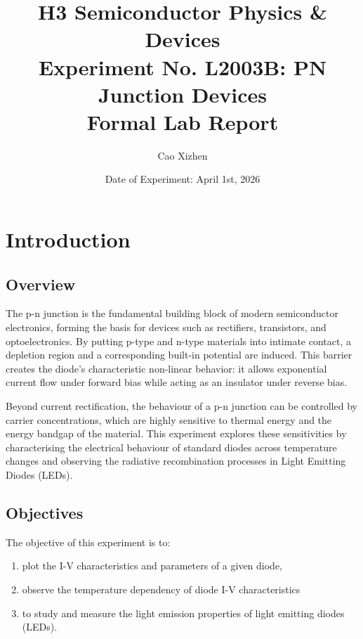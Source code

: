 \documentclass[1pt]{article}
\title{H3 Semiconductor Physics \& Devices\\Experiment No. L2003B: PN Junction Devices\\Formal Lab Report}
\author{Cao Xizhen}
\affil{Hwa Chong Institution (College Section)}
\date{Date of Experiment: April 1st, 2026}
\begin{document}
\maketitle
\tableofcontents
\clearpage

\section{Introduction}

\subsection{Overview}

The p-n junction is the fundamental building block of modern semiconductor electronics, forming the basis for devices such as rectifiers, transistors, and optoelectronics. By putting p-type and n-type materials into intimate contact, a depletion region and a corresponding built-in potential are induced. This barrier creates the diode's characteristic non-linear behavior: it allows exponential current flow under forward bias while acting as an insulator under reverse bias.

Beyond current rectification, the behaviour of a p-n junction can be controlled by carrier concentrations, which are highly sensitive to thermal energy and the energy bandgap of the material. This experiment explores these sensitivities by characterising the electrical behaviour of standard diodes across temperature changes and observing the radiative recombination processes in Light Emitting Diodes (LEDs).

\subsection{Objectives}

The objective of this experiment is to:

\begin{enumerate}
\item plot the I-V characteristics and parameters of a given diode, 
\vspace{-0.3\baselineskip}
\item observe the temperature dependency of diode I-V characteristics
\vspace{-0.3\baselineskip}
\item to study and measure the light emission properties of light emitting diodes (LEDs).
\end{enumerate}
\end{document}
